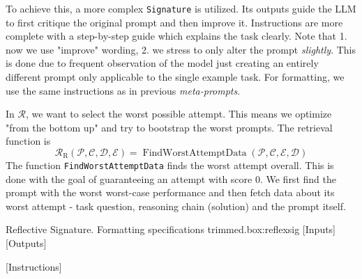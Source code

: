 To achieve this, a more complex \texttt{Signature} is utilized. Its outputs guide the LLM to first critique the original prompt
and then improve it. Instructions are more complete with a step-by-step guide which explains the task clearly.
Note that 1. now we use "improve" wording, 2. we stress to only alter the prompt \textit{slightly}. This is done due to 
frequent observation of the model just creating an entirely different prompt only applicable to the single example task.
For formatting, we use the same instructions as in previous \textit{meta-prompts}.

In $\mathcal{R}$, we want to select the worst possible attempt. This means we optimize "from the bottom up" and try to bootstrap the
worst prompts. The retrieval function is
\begin{equation}
    \mathcal{R}_{\text{R}}(\mathscr{P}, \mathcal{C}, \mathcal{D}, \mathcal{E}) = \operatorname{FindWorstAttemptData}(\mathscr{P}, \mathcal{C}, \mathcal{E}, \mathcal{D})
\end{equation}
The function \texttt{FindWorstAttemptData} finds the worst attempt overall. This is done with the goal of guaranteeing an attempt with score $0$.
We first find the prompt with the worst worst-case performance and then fetch data about its worst attempt - task question, reasoning chain (solution) and the prompt itself.

\begin{figurebox}{Reflective Signature. Formatting specifications trimmed.}{box:reflexsig}
    [Inputs]
    [Outputs]

    [Instructions]
\end{figurebox}


